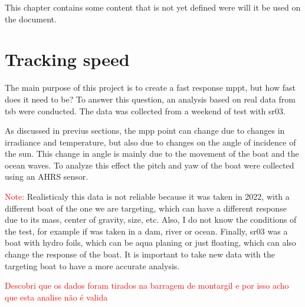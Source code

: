 This chapter contains some content that is not yet defined were will it be used on the document.

\section{Tracking speed}
The main purpose of this project is to create a fast response \ac{mppt}, but how fast does it need to be? To answer this question, an analysis based on real data from \ac{tsb} were conducted. The data was collected from a weekend of test with \ac{sr03}. 

As discussed in previus sections, the \ac{mpp} point can change due to changes in irradiance and temperature, but also due to changes on the angle of incidence of the sun. This change in angle is mainly due to the movement of the boat and the ocean waves. To analyze this effect the pitch and yaw of the boat were collected using an AHRS sensor.




\textcolor{red}{Note:} Realisticaly this data is not reliable because it was taken in 2022, with a different boat of the one we are targeting, which can have a different response due to its mass, center of gravity, size, etc. Also, I do not know the conditions of the test, for example if was taken in a dam, river or ocean. Finally, \ac{sr03} was a boat with hydro foils, which can be aqua planing or just floating, which can also change the response of the boat. It is important to take new data with the targeting boat to have a more accurate analysis. 

\textcolor{red}{Descobri que os dados foram tirados na barragem de montargil e por isso acho que esta analise não é valida}